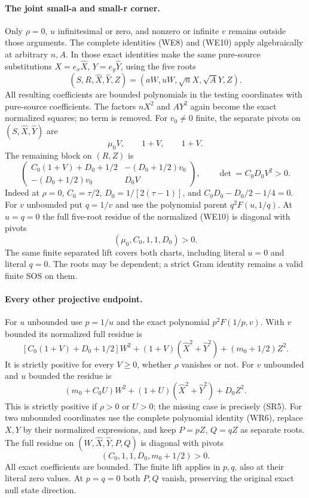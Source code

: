 \paragraph{The joint small-a and small-r corner.}
Only $\rho=0$, $u$ infinitesimal or zero, and nonzero or infinite
$v$ remains outside those arguments. The complete identities
(WE8) and (WE10) apply algebraically at arbitrary $n,A$.
In those exact identities make the same pure-source substitutions
$X=e_x\widehat X$, $Y=e_y\widehat Y$, using the five roots
\[
 (S,R,\widehat X,\widehat Y,Z)=(aW,uW,\sqrt n X,\sqrt A Y,Z).
\]
All resulting coefficients are bounded polynomials in the testing
coordinates with pure-source coefficients. The factors $nX^2$
and $AY^2$ again become the exact normalized squares; no term is
removed. For $v_0\ne0$ finite, the separate pivots on
$(S,\widehat X,\widehat Y)$ are
\[
 \mu_0V,\qquad 1+V,\qquad 1+V.
\]
The remaining block on $(R,Z)$ is
\[
 \begin{pmatrix}
 C_0(1+V)+D_0+1/2&-(D_0+1/2)v_0\\
 -(D_0+1/2)v_0&D_0V
 \end{pmatrix},\qquad \det=C_0D_0V^2>0.          \tag{SR4}
\]
Indeed at $\rho=0$, $C_0=\tau/2$,
$D_0=1/[2(\tau-1)]$, and
$C_0D_0-D_0/2-1/4=0$.
For $v$ unbounded put $q=1/v$ and use the polynomial parent
$q^2F(u,1/q)$. At $u=q=0$ the full five-root residue of the
normalized (WE10) is diagonal with pivots
\[
 (\mu_0,C_0,1,1,D_0)>0.                           \tag{SR5}
\]
The same finite separated lift covers both charts, including
literal $u=0$ and literal $q=0$. The roots may be dependent;
a strict Gram identity remains a valid finite SOS on them.

\paragraph{Every other projective endpoint.}
For $u$ unbounded use $p=1/u$ and the exact polynomial
$p^2F(1/p,v)$. With $v$ bounded its normalized full residue is
\[
 [C_0(1+V)+D_0+1/2]W^2
 +(1+V)(\widehat X^2+\widehat Y^2)+(m_0+1/2)Z^2.
                                                               \tag{SR6}
\]
It is strictly positive for every $V\ge0$, whether $\rho$ vanishes
or not. For $v$ unbounded and $u$ bounded the residue is
\[
 (m_0+C_0U)W^2+(1+U)(\widehat X^2+\widehat Y^2)+D_0Z^2.
                                                               \tag{SR7}
\]
This is strictly positive if $\rho>0$ or $U>0$; the missing
case is precisely (SR5).
For two unbounded coordinates use the complete polynomial identity
(WR6), replace $X,Y$ by their normalized expressions, and keep
$P=pZ$, $Q=qZ$ as separate roots. The full residue on
$(W,\widehat X,\widehat Y,P,Q)$ is diagonal with pivots
\[
 (C_0,1,1,D_0,m_0+1/2)>0.                         \tag{SR8}
\]
All exact coefficients are bounded. The finite lift applies in
$p,q$, also at their literal zero values. At $p=q=0$ both
$P,Q$ vanish, preserving the original exact null state direction.

